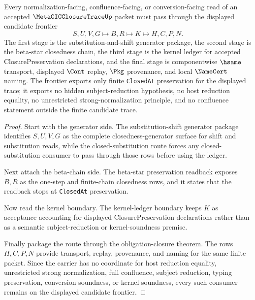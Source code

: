 \begin{theorem}
\label{thm:metacic-closure-trace-candidate-frontier}
Every normalization-facing, confluence-facing, or conversion-facing read of an accepted $\MetaCICClosureTraceUp$ packet must pass through the displayed candidate frontier
$$
S,U,V,G \longmapsto B,R \longmapsto K \longmapsto H,C,P,N .
$$
The first stage is the substitution-and-shift generator package, the second stage is the beta-star closedness chain, the third stage is the kernel ledger for accepted ClosurePreservation declarations, and the final stage is componentwise $\hsame$ transport, displayed $\Cont$ replay, $\Pkg$ provenance, and local $\NameCert$ naming. The frontier exports only finite \texttt{ClosedAt} preservation for the displayed trace; it exports no hidden subject-reduction hypothesis, no host reduction equality, no unrestricted strong-normalization principle, and no confluence statement outside the finite candidate trace.
\end{theorem}
\begin{proof}
Start with the generator side. The substitution-shift generator package identifies $S,U,V,G$ as the complete closedness-generator surface for shift and substitution reads, while the closed-substitution route forces any closed-substitution consumer to pass through those rows before using the ledger.

Next attach the beta-chain side. The beta-star preservation readback exposes $B,R$ as the one-step and finite-chain closedness rows, and it states that the readback stops at \texttt{ClosedAt} preservation.

Now read the kernel boundary. The kernel-ledger boundary keeps $K$ as acceptance accounting for displayed ClosurePreservation declarations rather than as a semantic subject-reduction or kernel-soundness premise.

Finally package the route through the obligation-closure theorem. The rows $H,C,P,N$ provide transport, replay, provenance, and naming for the same finite packet. Since the carrier has no coordinate for host reduction equality, unrestricted strong normalization, full confluence, subject reduction, typing preservation, conversion soundness, or kernel soundness, every such consumer remains on the displayed candidate frontier.
\end{proof}

